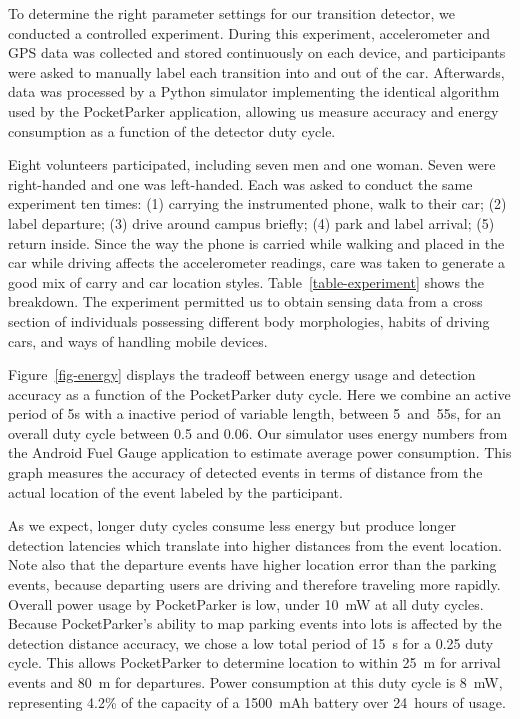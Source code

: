 

To determine the right parameter settings for our transition detector, we
conducted a controlled experiment. During this experiment, accelerometer and
GPS data was collected and stored continuously on each device, and
participants were asked to manually label each transition into and out of the
car. Afterwards, data was processed by a Python simulator implementing the
identical algorithm used by the PocketParker application, allowing us measure
accuracy and energy consumption as a function of the detector duty cycle.

Eight volunteers participated, including seven men and one woman. Seven were
right-handed and one was left-handed. Each was asked to conduct the same
experiment ten times: (1) carrying the instrumented phone, walk to their car;
(2) label departure; (3) drive around campus briefly; (4) park and label
arrival; (5) return inside. Since the way the phone is carried while walking
and placed in the car while driving affects the accelerometer readings, care
was taken to generate a good mix of carry and car location styles.
Table~\ref{table-experiment} shows the breakdown. The experiment permitted us
to obtain sensing data from a cross section of individuals possessing
different body morphologies, habits of driving cars, and ways of handling
mobile devices.

Figure~\ref{fig-energy} displays the tradeoff between energy usage and
detection accuracy as a function of the PocketParker duty cycle. Here we
combine an active period of 5s with a inactive period of variable length,
between 5~and~55s, for an overall duty cycle between 0.5 and 0.06. Our
simulator uses energy numbers from the Android Fuel Gauge application
to estimate average power consumption.  This graph measures the accuracy of
detected events in terms of distance from the actual location of the event
labeled by the participant.

As we expect, longer duty cycles consume less energy but produce longer
detection latencies which translate into higher distances from the event
location. Note also that the departure events have higher location error than
the parking events, because departing users are driving and therefore
traveling more rapidly. Overall power usage by PocketParker is low, under
10~mW at all duty cycles. Because PocketParker's ability to map parking
events into lots is affected by the detection distance accuracy, we chose a
low total period of 15~s for a 0.25 duty cycle. This allows PocketParker to
determine location to within 25~m for arrival events and 80~m for departures.
Power consumption at this duty cycle is 8~mW, representing 4.2\% of the
capacity of a 1500~mAh battery over 24~hours of usage.

